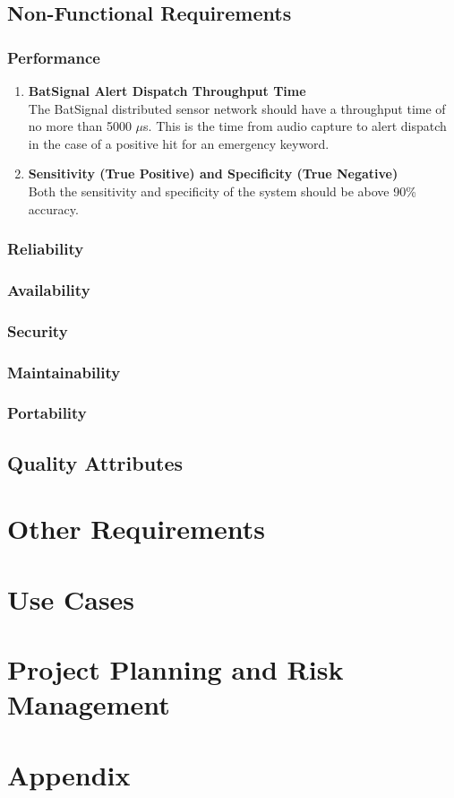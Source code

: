 \documentclass[10pt,a4paper]{article}
\begin{document}
\subsection{Non-Functional Requirements}
\subsubsection{Performance}
\begin{enumerate}
	\item{\textbf{BatSignal Alert Dispatch Throughput Time}} \\
	The BatSignal distributed sensor network should have a throughput time of no more than 5000 $\mu$s. This is the time from audio capture to alert dispatch in the case of a positive hit for an emergency keyword.
	\item{\textbf{Sensitivity (True Positive) and Specificity (True Negative)}} \\
	Both the sensitivity and specificity of the system should be above 90\% accuracy.
\end{enumerate}

\subsubsection{Reliability}

\subsubsection{Availability}

\subsubsection{Security}

\subsubsection{Maintainability}

\subsubsection{Portability}

\subsection{Quality Attributes}

\section{Other Requirements}

\section {Use Cases}

\section{Project Planning and Risk Management}

\appendix
\section{Appendix}
\end{document}
